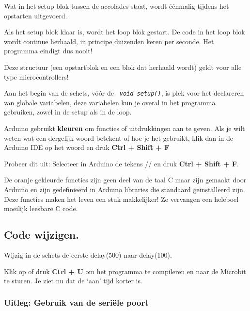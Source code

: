 Wat in het setup blok tussen de accolades {} staat, wordt éénmalig tijdens het opstarten uitgevoerd.

Als het setup blok klaar is, wordt het loop blok gestart. De code in het loop blok wordt continue herhaald, in principe duizenden keren per seconde. Het programma eindigt dus nooit!

Deze structuur (een opstartblok en een blok dat herhaald wordt) geldt voor alle type microcontrollers!

Aan het begin van de schets, vóór de \texttt{\textit{ \textcolor{arduinoBlue}{void} \textcolor{arduinoGreen}{setup}()}}, is plek voor het declareren van globale variabelen, deze variabelen kun je overal in het programma gebruiken, zowel in de setup als in de loop.

\colorbox{blue!15}{
	\begin{minipage}{\textwidth}
		Arduino gebruikt \textbf{kleuren} om \textcolor{BurntOrange}{functies} of \textcolor{BlueGreen}{uitdrukkingen} aan te geven. Als je wilt weten wat een dergelijk woord betekent of hoe je het gebruikt, klik dan in de Arduino IDE op het woord en druk 
		\colorbox{mygray}{\textbf{Ctrl + Shift + F}}
		
		Probeer dit uit: Selecteer in Arduino de tekens // en druk \colorbox{mygray}{\textbf{Ctrl + Shift + F}}.

	\end{minipage}
}

De \textcolor{BurntOrange}{oranje gekleurde functies} zijn geen deel van de taal C maar zijn gemaakt door Arduino en zijn gedefinieerd in Arduino libraries die standaard geïnstalleerd zijn. Deze functies maken het leven een stuk makkelijker! Ze vervangen een heleboel moeilijk leesbare C code.



\subsection{Code wijzigen.}

Wijzig in de schets de eerste \textcolor{BurntOrange}{delay}(500) naar \textcolor{BurntOrange}{delay}(100).


Klik op  of druk \colorbox{mygray}{\textbf{Ctrl + U}} om het programma te compileren en naar de Microbit te sturen.
Je ziet nu dat de ‘aan’ tijd korter is.

\subsubsection{Uitleg: Gebruik van de seriële poort}

